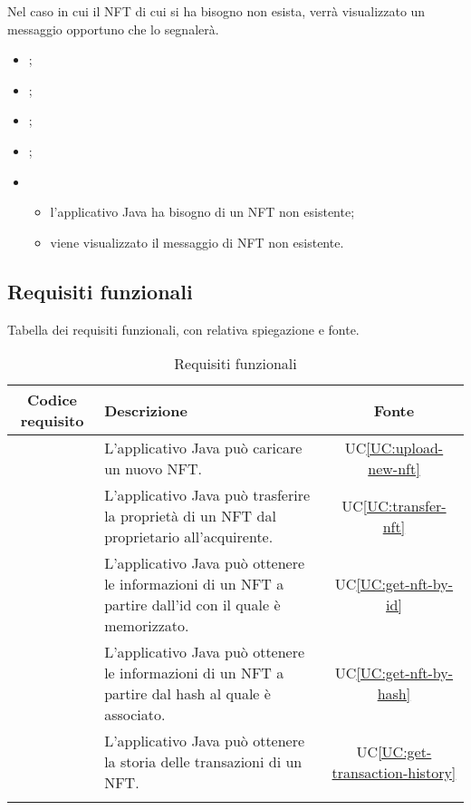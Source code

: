 Nel caso in cui il NFT di cui si ha bisogno non esista, verrà visualizzato un messaggio opportuno che lo segnalerà.

\begin{itemize}
  \item {};
  \item {};
  \item {};
  \item {};
  
  \item \UCMain
  \begin{itemize}
    \item l'applicativo Java ha bisogno di un NFT non esistente;
    \item viene visualizzato il messaggio di NFT non esistente.
  \end{itemize}
\end{itemize}

\subsection{Requisiti funzionali}
Tabella dei requisiti funzionali, con relativa spiegazione e fonte.
\begin{longtabu}{|c|X|c|}

  \hline 

  \textbf{Codice requisito} & \textbf{Descrizione} & \textbf{Fonte} \\ 

  \hline

   & L'applicativo Java può caricare un nuovo NFT. & UC\ref{UC:upload-new-nft} \\
  
  \hline

   & L'applicativo Java può trasferire la proprietà di un NFT dal proprietario all'acquirente. & UC\ref{UC:transfer-nft} \\ 
  
  \hline

   & L'applicativo Java può ottenere le informazioni di un NFT a partire dall'id con il quale è memorizzato. & UC\ref{UC:get-nft-by-id} \\ 
  
  \hline

   & L'applicativo Java può ottenere le informazioni di un NFT a partire dal hash al quale è associato. & UC\ref{UC:get-nft-by-hash} \\ 
  
  \hline

   & L'applicativo Java può ottenere la storia delle transazioni di un NFT. & UC\ref{UC:get-transaction-history} \\ 
  
  \hline

  \caption{Requisiti funzionali}
\end{longtabu}

